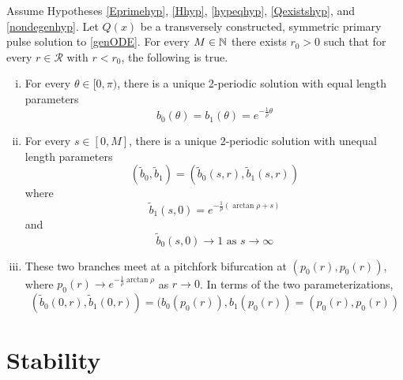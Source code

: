 \documentclass[thesis.tex]{subfiles}
\begin{document}
\begin{theorem}\label{2pulsebifurcation}
Assume Hypotheses \ref{Eprimehyp}, \ref{Hhyp}, \ref{hypeqhyp}, \ref{Qexistshyp}, and \ref{nondegenhyp}. Let $Q(x)$ be a transversely constructed, symmetric primary pulse solution to \eqref{genODE}. For every $M \in {\mathbb N}$ there exists $r_0 > 0$ such that for every $r \in \mathcal{R}$ with $r < r_0$, the following is true.
\begin{enumerate}[(i)]
	\item For every $\theta \in [0, \pi)$, there is a unique 2-periodic solution with equal length parameters 
	\[
	b_0(\theta) = b_1(\theta) = e^{-\frac{1}{\rho}\theta}
	\]
	\item For every $s \in [0, M]$, there is a unique 2-periodic solution with unequal length parameters
	\[
	(\tilde{b}_0, \tilde{b}_1) = (\tilde{b}_0(s, r), \tilde{b}_1(s, r))
	\]
	where
	\[
	\tilde{b}_1(s, 0) = e^{-\frac{1}{\rho}(\arctan \rho + s)}
	\]
	and
	\[
	\tilde{b}_0(s, 0) \rightarrow 1 \text{ as } s \rightarrow \infty
	\]
	\item These two branches meet at a pitchfork bifurcation at $(p_0(r), p_0(r))$, where $p_0(r) \rightarrow e^{-\frac{1}{\rho}\arctan \rho}$ as $r \rightarrow 0$. In terms of the two parameterizations,
	\[
	(\tilde{b}_0(0, r), \tilde{b}_1(0, r)) = (b_0(p_0(r)), b_1(p_0(r)) 
	= (p_0(r), p_0(r))
	\]
\end{enumerate}
\end{theorem}

\section{Stability}
\end{document}
